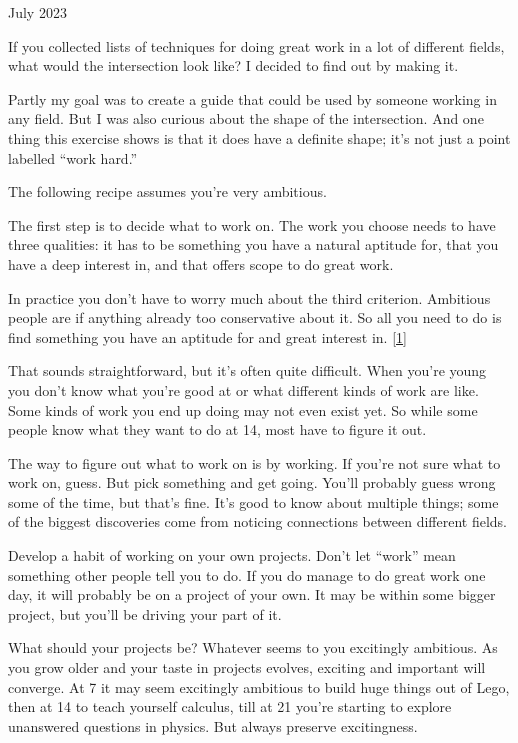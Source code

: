 July 2023

If you collected lists of techniques for doing great work in a lot of
different fields, what would the intersection look like? I decided to
find out by making it.

Partly my goal was to create a guide that could be used by someone
working in any field. But I was also curious about the shape of the
intersection. And one thing this exercise shows is that it does have a
definite shape; it's not just a point labelled ``work hard.''

The following recipe assumes you're very ambitious.

The first step is to decide what to work on. The work you choose needs
to have three qualities: it has to be something you have a natural
aptitude for, that you have a deep interest in, and that offers scope to
do great work.

In practice you don't have to worry much about the third criterion.
Ambitious people are if anything already too conservative about it. So
all you need to do is find something you have an aptitude for and great
interest in. {[}\hyperref[f1n]{1}{]}

That sounds straightforward, but it's often quite difficult. When you're
young you don't know what you're good at or what different kinds of work
are like. Some kinds of work you end up doing may not even exist yet. So
while some people know what they want to do at 14, most have to figure
it out.

The way to figure out what to work on is by working. If you're not sure
what to work on, guess. But pick something and get going. You'll
probably guess wrong some of the time, but that's fine. It's good to
know about multiple things; some of the biggest discoveries come from
noticing connections between different fields.

Develop a habit of working on your own projects. Don't let ``work'' mean
something other people tell you to do. If you do manage to do great work
one day, it will probably be on a project of your own. It may be within
some bigger project, but you'll be driving your part of it.

What should your projects be? Whatever seems to you excitingly
ambitious. As you grow older and your taste in projects evolves,
exciting and important will converge. At 7 it may seem excitingly
ambitious to build huge things out of Lego, then at 14 to teach yourself
calculus, till at 21 you're starting to explore unanswered questions in
physics. But always preserve excitingness.

